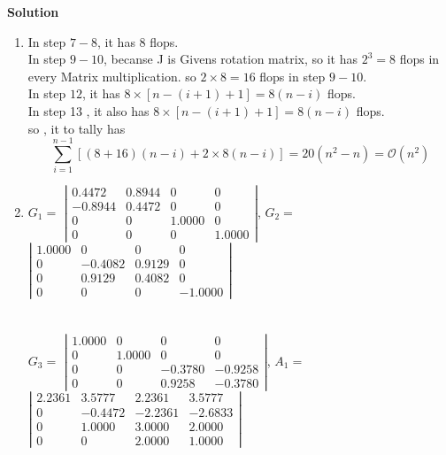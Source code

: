 \documentclass[english,onecolumn]{IEEEtran}
\begin{document}
\noindent
\textbf{Solution}
\begin{enumerate}
    \item
    In step $7-8$, it has $8$ flops.\\
    In step $9-10$, becanse J is Givens rotation matrix, so it has $2^{3}=8$ flops in every Matrix
    multiplication. so $2 \times 8=16$ flops in step $9-10$.\\
    In step $12$, it has $8 \times[n-(i+1)+1]=8(n-i)$ flops.\\
    In step 13 , it also has $8 \times[n-(i+1)+1]=8(n-i)$ flops.\\
    so , it to tally has
    $$
    \sum_{i=1}^{n-1}[(8+16)(n-i)+2\times 8(n-i)]=20\left(n^{2}-n\right)=\mathcal O\left(n^{2}\right)
    $$
    \item
    $G_1=$
    $\left|\begin{array}{rrrr}0.4472 & 0.8944 & 0 & 0 \\ -0.8944 & 0.4472 & 0 & 0 \\ 0 & 0 & 1.0000 & 0 \\ 0 & 0 & 0 & 1.0000\end{array}\right|$,
    $G_2=$
    $\left|\begin{array}{rrrr}1.0000 & 0 & 0 & 0 \\ 0 & -0.4082 & 0.9129 & 0 \\ 0 & 0.9129 & 0.4082 & 0 \\ 0 & 0 & 0 & -1.0000\end{array}\right|$\\\\\\
    $G_3=$
    $\left|\begin{array}{rrrr}1.0000 & 0 & 0 & 0 \\ 0 & 1.0000 & 0 & 0 \\ 0 & 0 & -0.3780 & -0.9258 \\ 0 & 0 & 0.9258 & -0.3780\end{array}\right|$,    
    $A_1=$
    $\left|\begin{array}{rrrr}2.2361 & 3.5777 & 2.2361 & 3.5777 \\ 0 & -0.4472 & -2.2361 & -2.6833 \\ 0 & 1.0000 & 3.0000 & 2.0000 \\ 0 & 0 & 2.0000 & 1.0000\end{array}\right|$\\\\\\
    

\end{enumerate}
\end{document}
